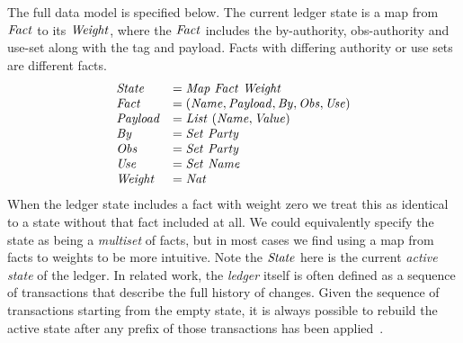 The full data model is specified below. The current ledger state is a map from $\mathit{Fact}$ to its $\mathit{Weight}$, where the $\mathit{Fact}$ includes the by-authority, obs-authority and use-set along with the tag and payload. Facts with differing authority or use sets are different facts.
$$
\begin{array}{ll}
   \mathit{State}   & = \mathit{Map}~ \mathit{Fact}~ \mathit{Weight}
\\ \mathit{Fact}    & = (\mathit{Name}, \mathit{Payload}, \mathit{By}, \mathit{Obs}, \mathit{Use})
\\ \mathit{Payload} & = \mathit{List}~ (\mathit{Name}, \mathit{Value})
\\ \mathit{By}      & = \mathit{Set}~ \mathit{Party}
\\ \mathit{Obs}     & = \mathit{Set}~ \mathit{Party}
\\ \mathit{Use}     & = \mathit{Set}~ \mathit{Name}
\\ \mathit{Weight}  & = \mathit{Nat}
\end{array}
$$
When the ledger state includes a fact with weight zero we treat this as identical to a state without that fact included at all. We could equivalently specify the state as being a \emph{multiset} of facts, but in most cases we find using a map from facts to weights to be more intuitive. Note the $\mathit{State}$ here is the current \emph{active state} of the ledger. In related work, the \emph{ledger} itself is often defined as a sequence of transactions that describe the full history of changes. Given the sequence of transactions starting from the empty state, it is always possible to rebuild the active state after any prefix of those transactions has been applied~\cite{Zahnentferner2018:Chimeric}.


